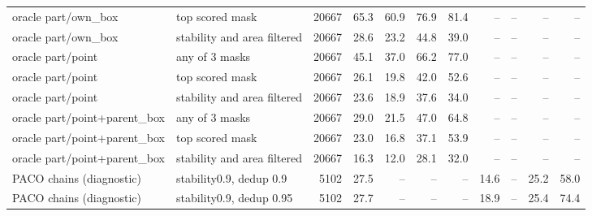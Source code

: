 \begin{tabular}{llrrrrrrrrr}
oracle part/own\_box & top scored mask & 20667 & 65.3 & 60.9 & 76.9 & 81.4 & -- & -- & -- & -- \\
oracle part/own\_box & stability and area filtered & 20667 & 28.6 & 23.2 & 44.8 & 39.0 & -- & -- & -- & -- \\
oracle part/point & any of 3 masks & 20667 & 45.1 & 37.0 & 66.2 & 77.0 & -- & -- & -- & -- \\
oracle part/point & top scored mask & 20667 & 26.1 & 19.8 & 42.0 & 52.6 & -- & -- & -- & -- \\
oracle part/point & stability and area filtered & 20667 & 23.6 & 18.9 & 37.6 & 34.0 & -- & -- & -- & -- \\
oracle part/point+parent\_box & any of 3 masks & 20667 & 29.0 & 21.5 & 47.0 & 64.8 & -- & -- & -- & -- \\
oracle part/point+parent\_box & top scored mask & 20667 & 23.0 & 16.8 & 37.1 & 53.9 & -- & -- & -- & -- \\
oracle part/point+parent\_box & stability and area filtered & 20667 & 16.3 & 12.0 & 28.1 & 32.0 & -- & -- & -- & -- \\
\midrule
PACO chains (diagnostic) & stability0.9, dedup 0.9 & 5102 & 27.5 & -- & -- & -- & 14.6 & -- & 25.2 & 58.0 \\
PACO chains (diagnostic) & stability0.9, dedup 0.95 & 5102 & 27.7 & -- & -- & -- & 18.9 & -- & 25.4 & 74.4 \\
\bottomrule
\end{tabular}
